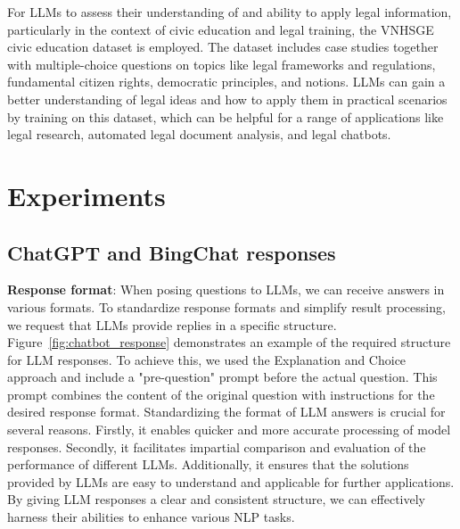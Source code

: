 \documentclass{article}
\begin{document}
{	For LLMs to assess their understanding of and ability to apply legal information, particularly in the context of civic education and legal training, the VNHSGE civic education dataset is employed. The dataset includes case studies together with multiple-choice questions on topics like legal frameworks and regulations, fundamental citizen rights, democratic principles, and notions. LLMs can gain a better understanding of legal ideas and how to apply them in practical scenarios by training on this dataset, which can be helpful for a range of applications like legal research, automated legal document analysis, and legal chatbots.
	
	\section{Experiments}
	\label{sec:experiments}
	
	\subsection{ChatGPT and BingChat responses} 
	
	
	
	\textbf{Response format}: When posing questions to LLMs, we can receive answers in various formats. To standardize response formats and simplify result processing, we request that LLMs provide replies in a specific structure. Figure~\ref{fig:chatbot_response} demonstrates an example of the required structure for LLM responses. To achieve this, we used the Explanation and Choice approach and include a "pre-question" prompt before the actual question. This prompt combines the content of the original question with instructions for the desired response format. Standardizing the format of LLM answers is crucial for several reasons. Firstly, it enables quicker and more accurate processing of model responses. Secondly, it facilitates impartial comparison and evaluation of the performance of different LLMs. Additionally, it ensures that the solutions provided by LLMs are easy to understand and applicable for further applications. By giving LLM responses a clear and consistent structure, we can effectively harness their abilities to enhance various NLP tasks.
	
}
\end{document}
